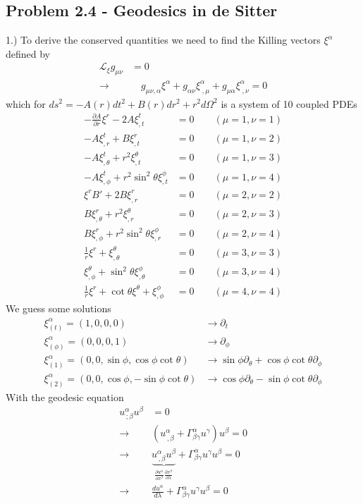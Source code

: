 \documentclass[10pt,a4paper]{book}
\theoremstyle{definition}
\begin{document}
\subsection{Problem 2.4 - Geodesics in de Sitter}
1.) To derive the conserved quantities we need to find the Killing vectors $\xi^\alpha$ defined by
\begin{align}
\mathcal{L}_\xi g_{\mu\nu}&=0\\
\rightarrow &\quad g_{\mu\nu,\alpha}\xi^\alpha+g_{\alpha\nu} \xi^\alpha_{\;,\mu}+g_{\mu\alpha} \xi^\alpha_{\;,\nu}=0
\end{align}
which for $ds^2=-A(r)dt^2+B(r)dr^2+r^2d\Omega^2$ is a system of 10 coupled PDEs
\begin{align}
-\frac{\partial A}{\partial r}\xi^r-2A\xi^t_{,t}&=0	\qquad(\mu=1,\nu=1)\\
-A\xi^t_{,r}+B\xi^r_{,t}&=0							\qquad(\mu=1,\nu=2)\\
-A\xi^t_{,\theta}+r^2\xi^\theta_{,t}&=0		\qquad(\mu=1,\nu=3)\\
-A\xi^t_{,\phi}+r^2\sin^2\theta\xi^\phi_{,t}&=0	\qquad(\mu=1,\nu=4)\\
%
\xi^rB'+2B\xi^r_{,r}&=0								\qquad(\mu=2,\nu=2)\\
B\xi^r_{,\theta}+r^2\xi^\theta_{,r}&=0			\qquad(\mu=2,\nu=3)\\
B\xi^r_{,\phi}+r^2\sin^2\theta\xi^\phi_{,r}&=0	\qquad(\mu=2,\nu=4)\\
%
\frac{1}{r}\xi^r+\xi^\theta_{,\theta}&=0			\qquad(\mu=3,\nu=3)\\
\xi^\theta_{,\phi}+\sin^2\theta\xi^\phi_{,\theta}&=0		\qquad(\mu=3,\nu=4)\\
%
\frac{1}{r}\xi^r+\cot\theta\xi^\theta+\xi^\phi_{,\phi}&=0	\qquad(\mu=4,\nu=4)
\end{align}
We guess some solutions
\begin{align}
\xi^\alpha_{(t)}=(1,0,0,0)&\rightarrow\partial_t\\
\xi^\alpha_{(\phi)}=(0,0,0,1)&\rightarrow\partial_\phi\\
\xi^\alpha_{(1)}=(0,0,\sin\phi,\cos\phi\cot\theta)&\rightarrow\sin\phi\partial_\theta+\cos\phi\cot\theta\partial_\phi\\
\xi^\alpha_{(2)}=(0,0,\cos\phi,-\sin\phi\cot\theta)&\rightarrow\cos\phi\partial_\theta-\sin\phi\cot\theta\partial_\phi
\end{align}
With the geodesic equation
\begin{align}
u^\alpha_{\,;\beta}u^\beta&=0\\
\rightarrow\quad& (u^\alpha_{\,,\beta}+\Gamma^\alpha_{\beta\gamma}u^\gamma)u^\beta=0\\
\rightarrow\quad& \underbrace{u^\alpha_{\,,\beta}u^\beta}_{\frac{\partial u^\alpha}{\partial x^\beta}\frac{\partial x^\beta}{\partial \lambda}}+\Gamma^\alpha_{\beta\gamma}u^\gamma u^\beta=0\\
\rightarrow\quad& \frac{du^\alpha}{d\lambda}+\Gamma^\alpha_{\beta\gamma}u^\gamma u^\beta=0
\end{align}
\end{document}
